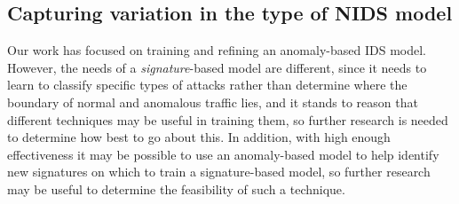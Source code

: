 \subsection{Capturing variation in the type of NIDS model}

    Our work has focused on training and refining an anomaly-based IDS model. However, the needs of a \textit{signature}-based model are different, since it needs to learn to classify specific types of attacks rather than determine where the boundary of normal and anomalous traffic lies, and it stands to reason that different techniques may be useful in training them, so further research is needed to determine how best to go about this. In addition, with high enough effectiveness it may be possible to use an anomaly-based model to help identify new signatures on which to train a signature-based model, so further research may be useful to determine the feasibility of such a technique.
